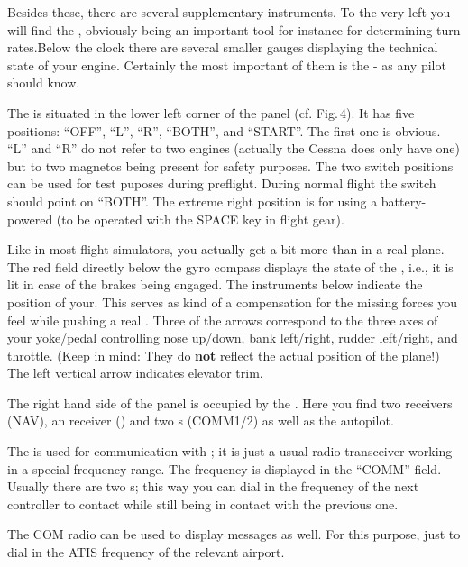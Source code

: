 Besides these, there are several supplementary instruments. To the very
left you will find the , obviously being an important tool
for instance for determining turn rates.Below the clock there are
several smaller gauges displaying the technical state of your engine.
Certainly the most important of them is the  - as
any pilot should know.

The  is situated in the lower left corner of the
panel (cf. Fig.\,4). It has five positions: ``OFF'', ``L'', ``R'',
``BOTH'', and ``START''. The first one is obvious. ``L'' and ``R'' do
not refer to two engines (actually the Cessna does only have one) but
to two magnetos being present for safety purposes. The two switch
positions can be used for test puposes during preflight. During normal
flight the switch should point on ``BOTH''. The extreme right position
is for  using a battery-powered
 (to be operated with the SPACE key in flight gear).

Like in most flight simulators, you actually get a bit more than in a
real plane. The red field directly below the gyro compass displays the
state of the , i.e., it is lit in case of the brakes
being engaged. The instruments below indicate the position of
your. This serves as kind of a compensation for the missing
forces you feel while pushing a real . Three of the arrows
correspond to the three axes of your yoke/pedal controlling nose
up/down, bank left/right, rudder left/right, and throttle. (Keep in
mind: They do \textbf{not} reflect the actual position of the plane!)
The left vertical arrow indicates elevator trim.

The right hand side of the panel is occupied by the . Here you find
two  receivers (NAV), an  receiver
() and two s (COMM1/2) as
well as the autopilot.

The  is used for communication with ; it is just a usual radio transceiver working in a special frequency range.
The frequency is displayed in the ``COMM'' field. Usually there are two s; this way you can dial in the frequency of the next controller to contact
while still being in contact with the previous one.

The COM radio can be used to display  messages as well. For
this purpose, just to dial in the ATIS frequency of the relevant
airport.

